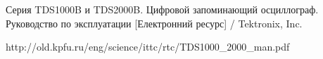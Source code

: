 \begin{thebibliography}{9}
Серия TDS1000B и TDS2000B. Цифровой запоминающий осциллограф. Руководство по эксплуатации [Електронний ресурс] / Tektronix, Inc.

http://old.kpfu.ru/eng/science/ittc/rtc/TDS1000\_2000\_man.pdf
\end{thebibliography}